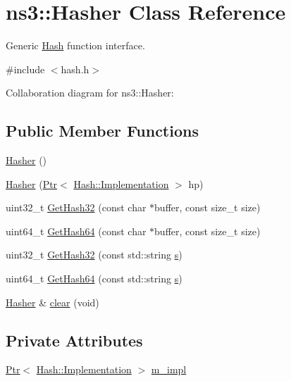 \hypertarget{classns3_1_1Hasher}{}\section{ns3\+:\+:Hasher Class Reference}
\label{classns3_1_1Hasher}


Generic \hyperlink{namespacens3_1_1Hash}{Hash} function interface.  




{\ttfamily \#include $<$hash.\+h$>$}



Collaboration diagram for ns3\+:\+:Hasher\+:
\subsection*{Public Member Functions}
\begin{DoxyCompactItemize}
\item 
\hyperlink{classns3_1_1Hasher_a137fd6ecd2281f201369ea8880934e71}{Hasher} ()
\item 
\hyperlink{classns3_1_1Hasher_ae659616319a1601e7fa527ef57a39422}{Hasher} (\hyperlink{classns3_1_1Ptr}{Ptr}$<$ \hyperlink{classns3_1_1Hash_1_1Implementation}{Hash\+::\+Implementation} $>$ hp)
\item 
uint32\+\_\+t \hyperlink{classns3_1_1Hasher_ae3508556dba4c2f4fc4901a059623117}{Get\+Hash32} (const char $\ast$buffer, const size\+\_\+t size)
\item 
uint64\+\_\+t \hyperlink{classns3_1_1Hasher_a88d83c8f9ae40f84df743b3efae2d9ce}{Get\+Hash64} (const char $\ast$buffer, const size\+\_\+t size)
\item 
uint32\+\_\+t \hyperlink{classns3_1_1Hasher_a412a5670ca266e384fb013d2175f65b7}{Get\+Hash32} (const std\+::string \hyperlink{generate__test__data__lte__sinr_8m_ad83eeb3a142285d1243a08c6b7026df8}{s})
\item 
uint64\+\_\+t \hyperlink{classns3_1_1Hasher_a81ee2195f18e2f97af9eb57c185542d2}{Get\+Hash64} (const std\+::string \hyperlink{generate__test__data__lte__sinr_8m_ad83eeb3a142285d1243a08c6b7026df8}{s})
\item 
\hyperlink{classns3_1_1Hasher}{Hasher} \& \hyperlink{classns3_1_1Hasher_a629108aa89019d84af8b2d85c7185f54}{clear} (void)
\end{DoxyCompactItemize}
\subsection*{Private Attributes}
\begin{DoxyCompactItemize}
\item 
\hyperlink{classns3_1_1Ptr}{Ptr}$<$ \hyperlink{classns3_1_1Hash_1_1Implementation}{Hash\+::\+Implementation} $>$ \hyperlink{classns3_1_1Hasher_a33ed78e6b2e454d98197339c75423883}{m\+\_\+impl}
\end{DoxyCompactItemize}


